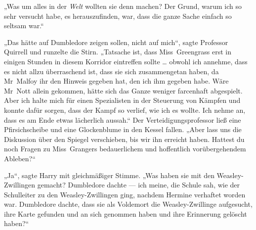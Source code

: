 „Was um alles in der \emph{Welt} wollten sie denn machen? Der Grund, warum ich so sehr versucht habe, es herauszufinden, war, dass die ganze Sache einfach so seltsam war.“

„Das hätte auf Dumbledore zeigen sollen, nicht auf mich“, sagte Professor Quirrell und runzelte die Stirn.
„Tatsache ist, dass Miss~Greengrass erst in einigen Stunden in diesem Korridor eintreffen sollte … obwohl ich annehme, dass es nicht allzu überraschend ist, dass sie sich zusammengetan haben, da Mr~Malfoy ihr den Hinweis gegeben hat, den ich ihm gegeben habe. Wäre Mr~Nott allein gekommen, hätte sich das Ganze weniger farcenhaft abgespielt. Aber ich halte mich für einen Spezialisten in der Steuerung von Kämpfen und konnte dafür sorgen, dass der Kampf so verlief, wie ich es wollte. Ich nehme an, dass es am Ende etwas lächerlich aussah.“
Der Verteidigungsprofessor ließ eine Pfirsichscheibe und eine Glockenblume in den Kessel fallen.
„Aber lass uns die Diskussion über den Spiegel verschieben, bis wir ihn erreicht haben. Hattest du noch Fragen zu Miss~Grangers bedauerlichem und hoffentlich vorübergehendem Ableben?“

„Ja“, sagte Harry mit gleichmäßiger Stimme.
„Was haben sie mit den Weasley-Zwillingen gemacht? Dumbledore dachte — ich meine, die Schule sah, wie der Schulleiter zu den Weasley-Zwillingen ging, nachdem Hermine verhaftet worden war. Dumbledore dachte, dass sie als Voldemort die Weasley-Zwillinge aufgesucht, ihre Karte gefunden und an sich genommen haben und ihre Erinnerung gelöscht haben?“

